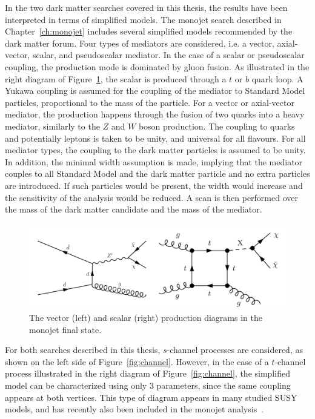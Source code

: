 In the two dark matter searches covered in this thesis, the results have been interpreted in terms of simplified models. The monojet search described in Chapter~\ref{ch:monojet} includes several simplified models recommended by the dark matter forum. Four types of mediators are considered, i.e. a vector, axial-vector, scalar, and pseudoscalar mediator. In the case of a scalar or pseudoscalar coupling, the production mode is dominated by gluon fusion. As illustrated in the right diagram of Figure~\ref{fig:monojet_diagrams}, the scalar is produced through a $t$ or $b$ quark loop. A Yukawa coupling is assumed for the coupling of the mediator to Standard Model particles, proportional to the mass of the particle. For a vector or axial-vector mediator, the production happens through the fusion of two quarks into a heavy mediator, similarly to the $Z$ and $W$ boson production. The coupling to quarks and potentially leptons is taken to be unity, and universal for all flavours. For all mediator types, the coupling to the dark matter particles is assumed to be unity. In addition, the minimal width assumption is made, implying that the mediator couples to all Standard Model and the dark matter particle and no extra particles are introduced. If such particles would be present, the width would increase and the sensitivity of the analysis would be reduced. A scan is then performed over the mass of the dark matter candidate and the mass of the mediator.

\begin{figure}[ht]
  \centering
 \includegraphics[width=.9\textwidth]{monojet_simplifiedmodel.png} 
 \caption{The vector (left) and scalar (right) production diagrams in the monojet final state.}
 \label{fig:monojet_diagrams}
\end{figure}

For both searches described in this thesis, $s$-channel processes are considered, as shown on the left side of Figure~\ref{fig:channel}. However, in the case of a $t$-channel process illustrated in the right diagram of Figure~\ref{fig:channel}, the simplified model can be characterized using only 3 parameters, since the same coupling appears at both vertices. This type of diagram appears in many studied \ac{SUSY} models, and has recently also been included in the monojet analysis~\cite{Sirunyan:2017jix}.

